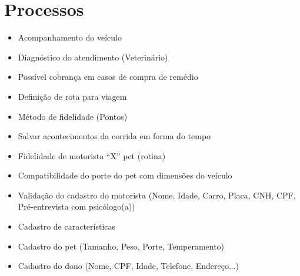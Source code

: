 \section{Processos}
\begin{itemize}
    \item Acompanhamento do veículo 
    \item Diagnóstico do atendimento (Veterinário)
    \item Possível cobrança em casos de compra de remédio
    \item Definição de rota para viagem
    \item Método de fidelidade (Pontos)
    \item Salvar acontecimentos da corrida em forma do tempo
    \item Fidelidade de motorista “X” pet (rotina)
    \item Compatibilidade do porte do pet com dimensões do veículo
    \item Validação do cadastro do motorista (Nome, Idade, Carro, Placa, CNH, CPF, Pré-entrevista com psicólogo(a))
    \item Cadastro de características
    \item Cadastro do pet (Tamanho, Peso, Porte, Temperamento)
    \item Cadastro do dono (Nome, CPF, Idade, Telefone, Endereço...)

\end{itemize}


